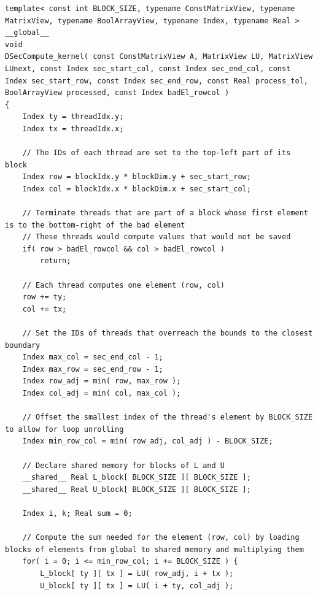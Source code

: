 \begin{lstlisting}[caption={The implementation of the \code{DSecCompute\_kernel()} kernel which computes one iteration of a diagonal section. Note that the matrices, vectors, and arrays are passed using their views, and the scalar values are copied to the local memory of each thread.},label={Listing:implementation->decomposition-project->implemented-solutions->decomposers->ICMxPP->kernels->diagonal-compute},escapechar=@]
template< const int BLOCK_SIZE, typename ConstMatrixView, typename MatrixView, typename BoolArrayView, typename Index, typename Real >
__global__
void
DSecCompute_kernel( const ConstMatrixView A, MatrixView LU, MatrixView LUnext, const Index sec_start_col, const Index sec_end_col, const Index sec_start_row, const Index sec_end_row, const Real process_tol, BoolArrayView processed, const Index badEl_rowcol )
{
	Index ty = threadIdx.y;
	Index tx = threadIdx.x;
	
	// The IDs of each thread are set to the top-left part of its block
	Index row = blockIdx.y * blockDim.y + sec_start_row;
	Index col = blockIdx.x * blockDim.x + sec_start_col;
	
	// Terminate threads that are part of a block whose first element is to the bottom-right of the bad element
	// These threads would compute values that would not be saved
	if( row > badEl_rowcol && col > badEl_rowcol )
		return;
	
	// Each thread computes one element (row, col)
	row += ty;
	col += tx;
	
	// Set the IDs of threads that overreach the bounds to the closest boundary
	Index max_col = sec_end_col - 1;
	Index max_row = sec_end_row - 1;
	Index row_adj = min( row, max_row );
	Index col_adj = min( col, max_col );
	
	// Offset the smallest index of the thread's element by BLOCK_SIZE to allow for loop unrolling
	Index min_row_col = min( row_adj, col_adj ) - BLOCK_SIZE;
	
	// Declare shared memory for blocks of L and U
	__shared__ Real L_block[ BLOCK_SIZE ][ BLOCK_SIZE ];
	__shared__ Real U_block[ BLOCK_SIZE ][ BLOCK_SIZE ];
	
	Index i, k; Real sum = 0;
	
	// Compute the sum needed for the element (row, col) by loading blocks of elements from global to shared memory and multiplying them
	for( i = 0; i <= min_row_col; i += BLOCK_SIZE ) {
		L_block[ ty ][ tx ] = LU( row_adj, i + tx );
		U_block[ ty ][ tx ] = LU( i + ty, col_adj );
		

\end{lstlisting}
